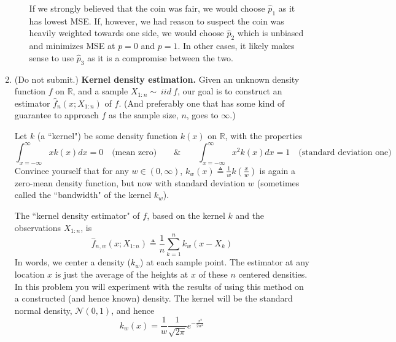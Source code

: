 \documentclass[11pt]{report}
\begin{document}
\begin{enumerate}[1.]
\begin{enumerate}
                    \color{blue}
                    If we strongly believed that the coin was fair, we would choose $\hat p_1$ as it has lowest MSE. If, however, we had reason to suspect the coin was heavily weighted towards one side, we would choose $\hat p_2$ which is unbiased and minimizes MSE at $p = 0$ and $p=1$. In other cases, it likely makes sense to use $\hat p_3$ as it is a compromise between the two.
                    \color{black}

          \end{enumerate}




          \pagebreak

    \item {\color{blue} (Do not submit.)} {\bf Kernel density estimation.}
          Given an unknown density function $f$ on $\mathbb{R}$, and a sample $X_{1:n}\sim\ iid\ f$, our goal is to construct an estimator $\hat{f}_n(x;X_{1:n})$ of $f$. (And preferably one that has some kind of guarantee to approach $f$ as the sample size, $n$, goes to $\infty$.)

          Let $k$ (a ``kernel") be some density function $k(x)$ on $\mathbb{R}$, with the properties
          \[
              \int_{x=-\infty}^\infty x k(x) dx = 0\quad\text{(mean zero)} \qquad \& \qquad \int_{x=-\infty}^\infty x^2 k(x)dx = 1\quad\text{(standard deviation one)}
          \]
          Convince yourself that for any $w \in (0,\infty)$, $\displaystyle k_w(x) \triangleq \frac{1}{w}k(\frac{x}{w})$ is again a zero-mean density function, but now with standard deviation $w$ (sometimes called the ``bandwidth" of the kernel $k_w$).

          The ``kernel density estimator" of $f$, based on the kernel $k$ and the observations $X_{1:n}$, is
          \[
              \hat{f}_{n,w}(x;X_{1:n}) \triangleq \frac{1}{n} \sum_{k=1}^n k_w(x-X_k)
          \]
          In words, we center a density ($k_w$) at each sample point. The estimator at any location $x$ is just the average of the heights at $x$ of these $n$ centered densities. In this problem you will experiment with the results of using this method on a constructed (and hence known) density. The kernel will be the standard normal density, $\mathcal{N}(0,1)$, and hence
          \[
              k_w(x) = \frac{1}{w}\frac{1}{\sqrt{2\pi}} e^{-\frac{x^2}{2w^2}}
          \]


\end{enumerate}
\end{document}
